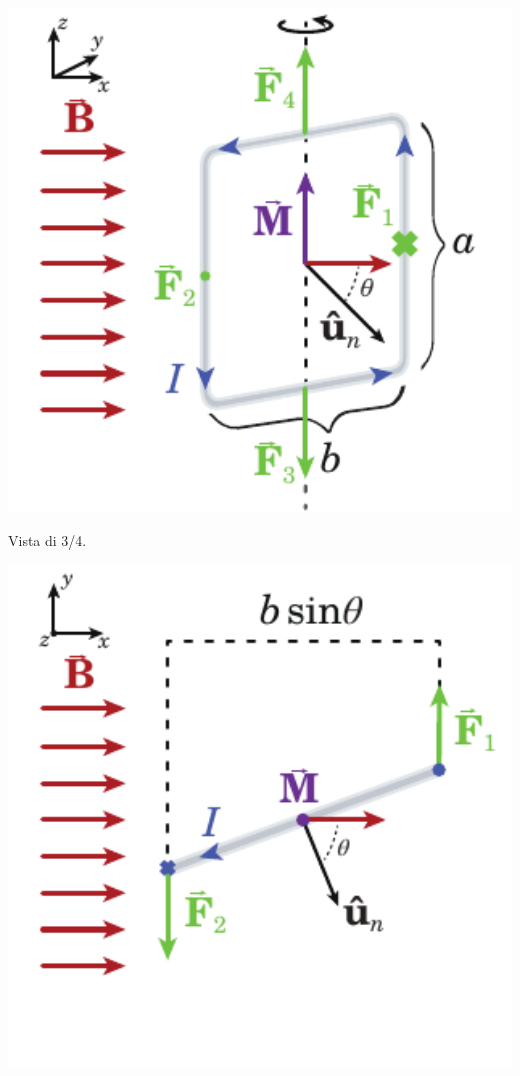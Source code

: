 \begin{center}
	\begin{minipage}{0.49\textwidth}
		\begin{center}
			\includegraphics[width=1\textwidth]{images/chp7/chp7momentospira1.pdf}
		\end{center}
	\begin{center}
		{\scriptsize Vista di 3/4.}
	\end{center}
	\end{minipage}
	\begin{minipage}{0.49\textwidth}
		\begin{center}
			\includegraphics[width=1\textwidth]{images/chp7/chp7momentospira2.pdf}

\end{center}
\end{minipage}
\end{center}
